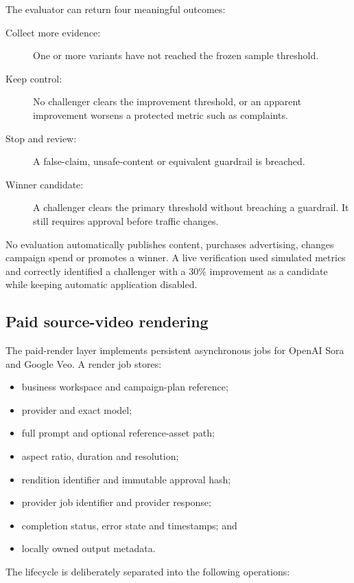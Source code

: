 The evaluator can return four meaningful outcomes:

\begin{description}
    \item[Collect more evidence:] One or more variants have not reached the frozen
    sample threshold.
    \item[Keep control:] No challenger clears the improvement threshold, or an
    apparent improvement worsens a protected metric such as complaints.
    \item[Stop and review:] A false-claim, unsafe-content or equivalent guardrail
    is breached.
    \item[Winner candidate:] A challenger clears the primary threshold without
    breaching a guardrail. It still requires approval before traffic changes.
\end{description}

No evaluation automatically publishes content, purchases advertising, changes
campaign spend or promotes a winner. A live verification used simulated metrics
and correctly identified a challenger with a 30\% improvement as a candidate
while keeping automatic application disabled.

\subsection{Paid source-video rendering}

The paid-render layer implements persistent asynchronous jobs for OpenAI Sora and
Google Veo. A render job stores:

\begin{itemize}
    \item business workspace and campaign-plan reference;
    \item provider and exact model;
    \item full prompt and optional reference-asset path;
    \item aspect ratio, duration and resolution;
    \item rendition identifier and immutable approval hash;
    \item provider job identifier and provider response;
    \item completion status, error state and timestamps; and
    \item locally owned output metadata.
\end{itemize}

The lifecycle is deliberately separated into the following operations:

